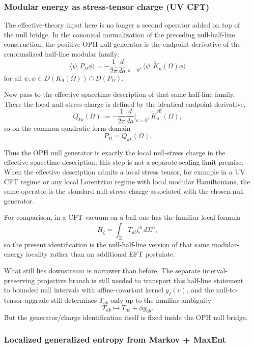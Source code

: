 \subsubsection{Modular energy as stress-tensor charge (UV CFT)}\label{53-modular-energy-as-stress-tensor-charge-uv-cft}

The effective-theory input here is no longer a second operator added on top of the null bridge. In the canonical normalization of the preceding null-half-line construction, the positive OPH null generator is the endpoint derivative of the renormalized half-line modular family:
\[
\langle\psi,P_\Omega\phi\rangle
=
-\frac{1}{2\pi}\frac{d}{da}\Big|_{a=0^+}
\langle\psi,\widetilde K_a(\Omega)\phi\rangle
\]
for all \(\psi,\phi\in D(K_0(\Omega))\cap D(P_\Omega)\).

Now pass to the effective spacetime description of that same half-line family. There the local null-stress charge is defined by the identical endpoint derivative,
\[
Q_{kk}(\Omega)
:=
-\frac{1}{2\pi}\frac{d}{da}\Big|_{a=0^+}\widetilde K^{\mathrm{eff}}_a(\Omega),
\]
so on the common quadratic-form domain
\[
P_\Omega = Q_{kk}(\Omega).
\]

Thus the OPH null generator is exactly the local null-stress charge in the effective spacetime description; this step is not a separate scaling-limit premise. When the effective description admits a local stress tensor, for example in a UV CFT regime or any local Lorentzian regime with local modular Hamiltonians, the same operator is the standard null-stress charge associated with the chosen null generator.

For comparison, in a CFT vacuum on a ball one has the familiar local formula
\[
H_{\zeta}=\int_{\Sigma}T_{ab}\zeta^b\,d\Sigma^a,
\]
so the present identification is the null-half-line version of that same modular-energy locality rather than an additional EFT postulate.

What still lies downstream is narrower than before. The separate interval-preserving projective branch is still needed to transport this half-line statement to bounded null intervals with affine-covariant kernel \(g_I(v)\), and the null-to-tensor upgrade still determines \(T_{ab}\) only up to the familiar ambiguity
\[
T_{ab}\mapsto T_{ab}+\phi g_{ab}.
\]
But the generator/charge identification itself is fixed inside the OPH null bridge.

\subsubsection{Localized generalized entropy from Markov + MaxEnt}\label{54-localized-generalized-entropy-from-markov--maxent}

